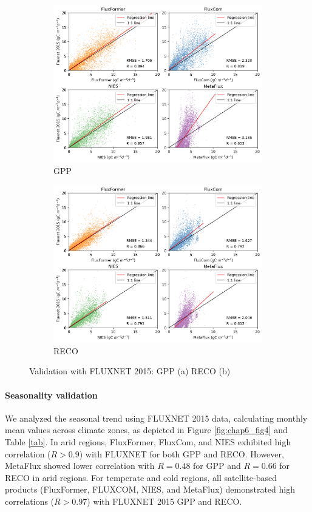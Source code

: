 \begin{figure}[p]
    \centering
    \begin{subfigure}{\textwidth}
      \centering
      \includegraphics[width=.8\textwidth]{figs/chap6/val_fluxnet_all_GPP.png}
      \caption{GPP}
      \label{fig:chap6_fig3a}
    \end{subfigure}

    \begin{subfigure}{\textwidth}
      \centering
      \includegraphics[width=.8\textwidth]{figs/chap6/val_fluxnet_all_RECO.png}
      \caption{RECO}
      \label{fig:chap6_fig3b}
    \end{subfigure}
    \caption[Validation with FLUXNET 2015]{Validation with FLUXNET 2015: GPP (a) RECO (b)}
    \label{fig:chap6_fig3}
\end{figure}
\paragraph*{Seasonality validation}
We analyzed the seasonal trend using FLUXNET 2015 data, calculating monthly mean values across climate zones, as depicted in Figure \ref{fig:chap6_fig4} and Table \ref{tab}. In arid regions, FluxFormer, FluxCom, and NIES exhibited high correlation ($R > 0.9$) with FLUXNET for both GPP and RECO. However, MetaFlux showed lower correlation with $R=0.48$ for GPP and $R=0.66$ for RECO in arid regions. For temperate and cold regions, all satellite-based products (FluxFormer, FLUXCOM, NIES, and MetaFlux) demonstrated high correlations ($R>0.97$) with FLUXNET 2015 GPP and RECO. \par

